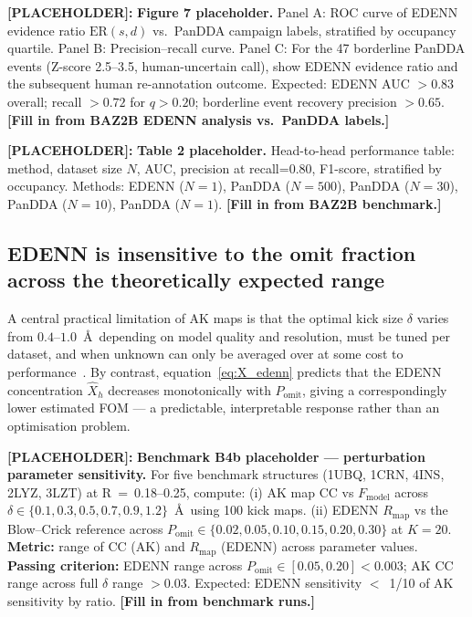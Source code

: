 \documentclass[10pt,twocolumn]{article}
\newcommand{\placeholder}[1]{%
  \begin{mdframed}[
    linecolor=placeholder,linewidth=1pt,
    backgroundcolor=red!5,
    innertopmargin=6pt,innerbottommargin=6pt,
    innerleftmargin=8pt,innerrightmargin=8pt]
  \small\color{placeholder}\textbf{[PLACEHOLDER]:} #1
  \end{mdframed}
}
\begin{document}
\placeholder{
\textbf{Figure 7 placeholder.}
Panel A: ROC curve of EDENN evidence ratio $\mathrm{ER}(s,d)$
vs.\ PanDDA campaign labels, stratified by occupancy quartile.
Panel B: Precision--recall curve.
Panel C: For the 47 borderline PanDDA events (Z-score 2.5--3.5,
human-uncertain call), show EDENN evidence ratio and the
subsequent human re-annotation outcome.
Expected: EDENN AUC $> 0.83$ overall; recall $> 0.72$ for
$q > 0.20$; borderline event recovery precision $> 0.65$.
\textbf{[Fill in from BAZ2B EDENN analysis vs.\ PanDDA labels.]}
}

\placeholder{
\textbf{Table 2 placeholder.}
Head-to-head performance table: method, dataset size $N$,
AUC, precision at recall=0.80, F1-score, stratified by occupancy.
Methods: EDENN ($N=1$), PanDDA ($N=500$), PanDDA ($N=30$),
PanDDA ($N=10$), PanDDA ($N=1$).
\textbf{[Fill in from BAZ2B benchmark.]}
}

\subsection{EDENN is insensitive to the omit fraction across the
theoretically expected range}

A central practical limitation of AK maps is that the optimal kick
size $\delta$ varies from $0.4$--$1.0$~\AA\ depending on model
quality and resolution, must be tuned per dataset, and when
unknown can only be averaged over at some cost to
performance~\cite{praznk2009}.
By contrast, equation~\eqref{eq:X_edenn} predicts that the EDENN
concentration $\hat{X}_h$ decreases monotonically with
$P_\mathrm{omit}$, giving a correspondingly lower estimated FOM
--- a predictable, interpretable response rather than an optimisation
problem.

\placeholder{
\textbf{Benchmark B4b placeholder --- perturbation parameter sensitivity.}
For five benchmark structures (1UBQ, 1CRN, 4INS, 2LYZ, 3LZT) at
R~=~0.18--0.25, compute:
(i) AK map CC vs $F_\mathrm{model}$ across
$\delta \in \{0.1, 0.3, 0.5, 0.7, 0.9, 1.2\}$~\AA\ using 100
kick maps.
(ii) EDENN $R_\mathrm{map}$ vs the Blow--Crick reference across
$P_\mathrm{omit} \in \{0.02, 0.05, 0.10, 0.15, 0.20, 0.30\}$
at $K=20$.
\textbf{Metric:} range of CC (AK) and $R_\mathrm{map}$ (EDENN)
across parameter values.
\textbf{Passing criterion:} EDENN range across
$P_\mathrm{omit} \in [0.05, 0.20] < 0.003$;
AK CC range across full $\delta$ range $> 0.03$.
Expected: EDENN sensitivity $<$~1/10 of AK sensitivity by ratio.
\textbf{[Fill in from benchmark runs.]}
}
\end{document}
